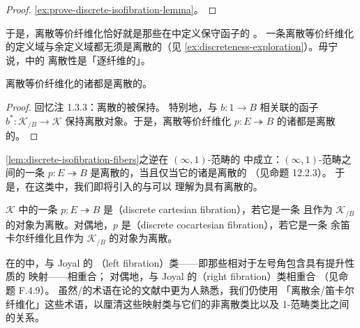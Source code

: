 \begin{proof}
\cref{ex:prove-discrete-isofibration-lemma}。
\end{proof}

于是，离散等价纤维化恰好就是那些在\trHomotopyTwoCategory{}中定义保守函子的%
\trIsofibration。
一条离散等价纤维化的定义域与余定义域都无须是离散的\trInfinityCategory{}（见%
\cref{ex:discreteness-exploration}）。毋宁说，\trSliceInfinityCosmos{}中的%
离散性是「逐纤维的」。

\begin{lemma}\label{lem:discrete-isofibration-fibers}
离散等价纤维化的诸\trFiber{}都是离散的\trInfinityCategory。
\end{lemma}

\begin{proof}
回忆注 1.3.3：离散的\trInfinityCategory{}被\trCosmologicalFunctor{}保持。
特别地，与\trElement{} $b\colon 1\to B$ 相关联的\trPullback{}函子
$b^{*}\colon\mathcal{K}_{/B}\to\mathcal{K}$ 保持离散对象。于是，离散等价纤维化
$p\colon E\twoheadrightarrow B$ 的诸\trFiber{}都是离散的\trInfinityCategory。
\end{proof}

\cref{lem:discrete-isofibration-fibers}之逆在 $(\infty,1)$-范畴的%
\trInfinityCosmos{}中成立：$(\infty,1)$-范畴之间的一条\trIsofibration{}
$p\colon E\twoheadrightarrow B$ 是离散的，当且仅当它的诸\trFiber{}是离散的%
\trInfinityCategory{}（见命题 12.2.3）。
于是，在这类\trInfinityCosmos{}中，我们即将引入的\trDiscreteCartesianFibration{}与\trDiscreteCocartesianFibration{}可以
理解为具有离散\trFiber{}的\trCartesianFibration。

\begin{definition}\label{def:discrete-co-cartesian-fibration}
\trInfinityCosmos{} $\mathcal{K}$ 中的一条\trIsofibration{}
$p\colon E\twoheadrightarrow B$
是\textbf{\trDiscreteCartesianFibration}（discrete cartesian fibration），若它是一条%
\trCartesianFibration{}且作为 $\mathcal{K}_{/B}$ 的对象为离散。对偶地，$p$
是\textbf{\trDiscreteCocartesianFibration}（discrete cocartesian fibration），若它是一条%
余笛卡尔纤维化且作为 $\mathcal{K}_{/B}$ 的对象为离散。
\end{definition}

\begin{digression}\label{dig:left-right-fibrations}
在\trQuasiCategory{}的\trInfinityCosmos{}中，\trDiscreteCocartesianFibration{}与 Joyal 的%
\textbf{\trLeftFibration}（left fibration）类——即那些相对于左号角包含具有提升性质的%
映射——相重合；
对偶地，\trDiscreteCartesianFibration{}与 Joyal 的\textbf{\trRightFibration}（right fibration）类相重合
（见命题 F.4.9）。
虽然\trLeftFibration/\trRightFibration{}的术语在\trInfinityCategory{}论的文献中更为人熟悉，我们仍使用%
「离散余/笛卡尔%
纤维化」这些术语，以厘清这些映射类与它们的非离散类比以及 1-范畴类比之间的关系。
\end{digression}

